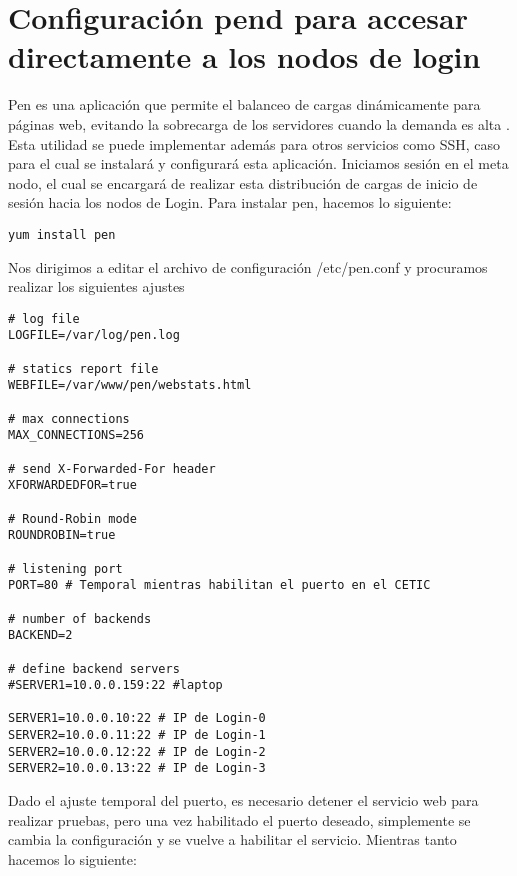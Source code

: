 \chapter{Configuración pend para accesar directamente a los nodos de login}
Pen es una aplicación que permite el balanceo de cargas dinámicamente para páginas web, evitando la sobrecarga de los servidores cuando la demanda es alta \cite{pendhttp}. Esta utilidad se puede implementar además para otros servicios como SSH, caso para el cual se instalará y configurará esta aplicación.
Iniciamos sesión en el meta nodo, el cual se encargará de realizar esta distribución de cargas de inicio de sesión hacia los nodos de Login. Para instalar pen, hacemos lo siguiente:
\begin{lstlisting} 
yum install pen
\end{lstlisting}
Nos dirigimos a editar el archivo de configuración /etc/pen.conf y procuramos realizar los siguientes ajustes
\begin{lstlisting} 
# log file
LOGFILE=/var/log/pen.log

# statics report file
WEBFILE=/var/www/pen/webstats.html

# max connections
MAX_CONNECTIONS=256

# send X-Forwarded-For header
XFORWARDEDFOR=true

# Round-Robin mode
ROUNDROBIN=true

# listening port
PORT=80 # Temporal mientras habilitan el puerto en el CETIC

# number of backends
BACKEND=2

# define backend servers
#SERVER1=10.0.0.159:22 #laptop

SERVER1=10.0.0.10:22 # IP de Login-0
SERVER2=10.0.0.11:22 # IP de Login-1
SERVER2=10.0.0.12:22 # IP de Login-2
SERVER2=10.0.0.13:22 # IP de Login-3
\end{lstlisting}
Dado el ajuste temporal del puerto, es necesario detener el servicio web para realizar pruebas, pero una vez habilitado el puerto deseado, simplemente se cambia la configuración y se vuelve a habilitar el servicio. Mientras tanto hacemos lo siguiente:
